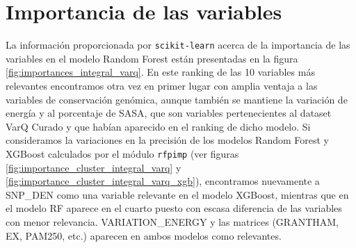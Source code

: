\section{Importancia de las variables}
La información proporcionada por \texttt{scikit-learn} acerca de la importancia de las variables en el modelo Random Forest están presentadas en la figura \ref{fig:importances_integral_varq}. En este ranking de las 10 variables más relevantes encontramos otra vez en primer lugar con amplia ventaja a las variables de conservación genómica, aunque también se mantiene la variación de energía y al porcentaje de SASA, que son variables pertenecientes al dataset VarQ Curado y que habían aparecido en el ranking de dicho modelo. Si consideramos la variaciones en la precisión de los modelos Random Forest y XGBoost calculados por el módulo \texttt{rfpimp} (ver figuras \ref{fig:importance_cluster_integral_varq} y \ref{fig:importance_cluster_integral_varq_xgb}), encontramos nuevamente a SNP\_DEN como una variable relevante en el modelo XGBoost, mientras que en el modelo RF aparece en el cuarto puesto con escasa diferencia de las variables con menor relevancia. VARIATION\_ENERGY y las matrices (GRANTHAM, EX, PAM250, etc.) aparecen en ambos modelos como relevantes. 


